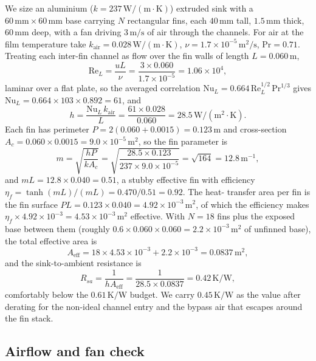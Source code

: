 We size an aluminium ($k = 237\,\text{W}/(\text{m}\cdot\si{\kelvin})$)
extruded sink with a $60\,\si{\milli\meter} \times 60\,\si{\milli\meter}$
base carrying $N$ rectangular fins, each $40\,\si{\milli\meter}$ tall,
$1.5\,\si{\milli\meter}$ thick, $60\,\si{\milli\meter}$ deep, with a fan
driving $3\,\text{m/s}$ of air through the channels. For air at the film
temperature take $k_{\text{air}} = 0.028\,\text{W}/(\text{m}\cdot\si{
\kelvin})$, $\nu = 1.7 \times 10^{-5}\,\text{m}^2/\text{s}$, $\text{Pr}
= 0.71$. Treating each inter-fin channel as flow over the fin walls of
length $L = 0.060\,\text{m}$,
\[
\text{Re}_L = \frac{u L}{\nu} = \frac{3 \times 0.060}{1.7 \times 10^{-5}}
= 1.06 \times 10^4,
\]
laminar over a flat plate, so the averaged correlation
$\text{Nu}_L = 0.664\,\text{Re}_L^{1/2}\,\text{Pr}^{1/3}$ gives
$\text{Nu}_L = 0.664 \times 103 \times 0.892 = 61$, and
\[
h = \frac{\text{Nu}_L\,k_{\text{air}}}{L} = \frac{61 \times 0.028}{0.060}
= 28.5\,\text{W}/(\text{m}^2\cdot\si{\kelvin}).
\]
Each fin has perimeter $P = 2(0.060 + 0.0015) = 0.123\,\text{m}$ and
cross-section $A_c = 0.060 \times 0.0015 = 9.0 \times 10^{-5}\,\text{m}^2$,
so the fin parameter is
\[
m = \sqrt{\frac{h P}{k A_c}} = \sqrt{\frac{28.5 \times 0.123}{237 \times
9.0 \times 10^{-5}}} = \sqrt{164} = 12.8\,\text{m}^{-1},
\]
and $mL = 12.8 \times 0.040 = 0.51$, a stubby effective fin with
efficiency $\eta_f = \tanh(mL)/(mL) = 0.470/0.51 = 0.92$. The heat-
transfer area per fin is the fin surface $P L = 0.123 \times 0.040 =
4.92 \times 10^{-3}\,\text{m}^2$, of which the efficiency makes
$\eta_f \times 4.92 \times 10^{-3} = 4.53 \times 10^{-3}\,\text{m}^2$
effective. With $N = 18$ fins plus the exposed base between them
(roughly $0.6 \times 0.060 \times 0.060 = 2.2 \times 10^{-3}\,\text{m}^2$
of unfinned base), the total effective area is
\[
A_{\text{eff}} = 18 \times 4.53 \times 10^{-3} + 2.2 \times 10^{-3} =
0.0837\,\text{m}^2,
\]
and the sink-to-ambient resistance is
\[
R_{sa} = \frac{1}{h A_{\text{eff}}} = \frac{1}{28.5 \times 0.0837} =
0.42\,\si{\kelvin}/\text{W},
\]
comfortably below the $0.61\,\si{\kelvin}/\text{W}$ budget. We carry
$0.45\,\si{\kelvin}/\text{W}$ as the value after derating for the
non-ideal channel entry and the bypass air that escapes around the fin
stack.

\subsection{Airflow and fan check}

